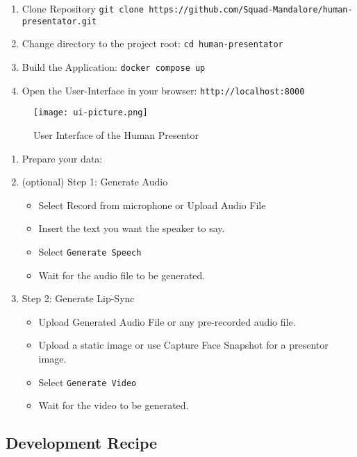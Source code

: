 \begin{enumerate}
    \item Clone Repository \texttt{git clone https://github.com/Squad-Mandalore/human-presentator.git}
    \item Change directory to the project root: \texttt{cd human-presentator}
    \item Build the Application: \texttt{docker compose up}
    \item Open the User-Interface in your browser: \texttt{http://localhost:8000}
\end{enumerate}

\begin{figure}[H]
  \centering
  \texttt{[image: ui-picture.png]}
  \caption{User Interface of the Human Presentor}
  \label{fig:architecture}
\end{figure}

\begin{enumerate}
    \item Prepare your data:
    \item (optional) Step 1: Generate Audio
        \begin{itemize}
            \item Select Record from microphone or Upload Audio File
            \item Insert the text you want the speaker to say.
            \item Select \texttt{Generate Speech}
            \item Wait for the audio file to be generated.
        \end{itemize}
    \item Step 2: Generate Lip-Sync
        \begin{itemize}
            \item Upload Generated Audio File or any pre-recorded audio file.
            \item Upload a static image or use Capture Face Snapshot for a presentor image.
            \item Select \texttt{Generate Video}
            \item Wait for the video to be generated.
        \end{itemize}
\end{enumerate}

\subsection{Development Recipe}

